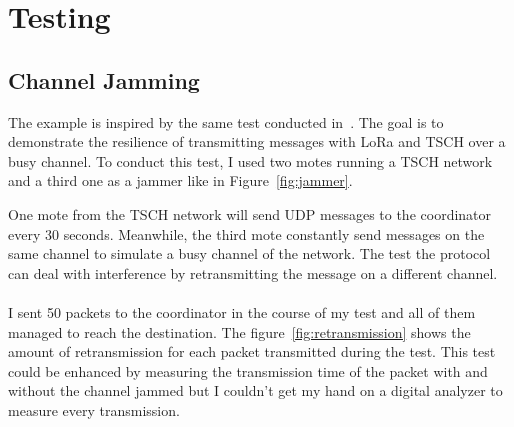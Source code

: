 \section{Testing\label{section:tschtesting}}

\subsection{Channel Jamming}

The example is inspired by the same test conducted in~\cite{tschoverlora}.
The goal is to demonstrate the resilience of transmitting messages with LoRa and
TSCH over a busy channel.
To conduct this test, I used two motes running a TSCH network and a third one
as a jammer like in Figure~\ref{fig:jammer}.



One mote from the TSCH network will send UDP messages to the coordinator
every 30 seconds.
Meanwhile, the third mote constantly send messages on the same channel to
simulate a busy channel of the network.
The test the protocol can deal with interference by retransmitting 
the message on a different channel.

\paragraph{}

I sent 50 packets to the coordinator in the course of my test and all of them
managed to reach the destination.
The figure~\ref{fig:retransmission} shows the amount of retransmission for each
packet transmitted during the test.
This test could be enhanced by measuring the transmission time of the packet
with and without the channel jammed but I couldn't get my hand on a digital
analyzer to measure every transmission.

